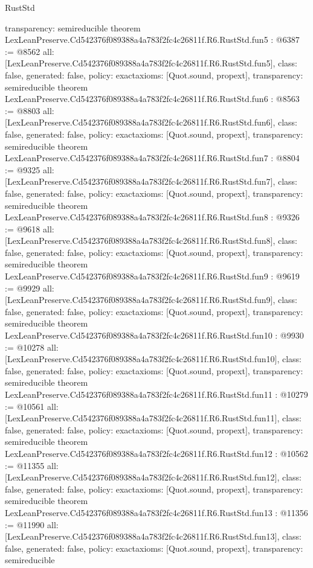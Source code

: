 \begin{lexlean}{RustStd}
\begin{coremodule}
{  transparency: semireducible
}
theorem LexLeanPreserve.Cd542376f089388a4a783f2fc4c26811f.R6.RustStd.fun5 : @6387 := @8562 {
  all: [LexLeanPreserve.Cd542376f089388a4a783f2fc4c26811f.R6.RustStd.fun5],
  class: false,
  generated: false,
  policy: exact{axioms: [Quot.sound, propext]},
  transparency: semireducible
}
theorem LexLeanPreserve.Cd542376f089388a4a783f2fc4c26811f.R6.RustStd.fun6 : @8563 := @8803 {
  all: [LexLeanPreserve.Cd542376f089388a4a783f2fc4c26811f.R6.RustStd.fun6],
  class: false,
  generated: false,
  policy: exact{axioms: [Quot.sound, propext]},
  transparency: semireducible
}
theorem LexLeanPreserve.Cd542376f089388a4a783f2fc4c26811f.R6.RustStd.fun7 : @8804 := @9325 {
  all: [LexLeanPreserve.Cd542376f089388a4a783f2fc4c26811f.R6.RustStd.fun7],
  class: false,
  generated: false,
  policy: exact{axioms: [Quot.sound, propext]},
  transparency: semireducible
}
theorem LexLeanPreserve.Cd542376f089388a4a783f2fc4c26811f.R6.RustStd.fun8 : @9326 := @9618 {
  all: [LexLeanPreserve.Cd542376f089388a4a783f2fc4c26811f.R6.RustStd.fun8],
  class: false,
  generated: false,
  policy: exact{axioms: [Quot.sound, propext]},
  transparency: semireducible
}
theorem LexLeanPreserve.Cd542376f089388a4a783f2fc4c26811f.R6.RustStd.fun9 : @9619 := @9929 {
  all: [LexLeanPreserve.Cd542376f089388a4a783f2fc4c26811f.R6.RustStd.fun9],
  class: false,
  generated: false,
  policy: exact{axioms: [Quot.sound, propext]},
  transparency: semireducible
}
theorem LexLeanPreserve.Cd542376f089388a4a783f2fc4c26811f.R6.RustStd.fun10 : @9930 := @10278 {
  all: [LexLeanPreserve.Cd542376f089388a4a783f2fc4c26811f.R6.RustStd.fun10],
  class: false,
  generated: false,
  policy: exact{axioms: [Quot.sound, propext]},
  transparency: semireducible
}
theorem LexLeanPreserve.Cd542376f089388a4a783f2fc4c26811f.R6.RustStd.fun11 : @10279 := @10561 {
  all: [LexLeanPreserve.Cd542376f089388a4a783f2fc4c26811f.R6.RustStd.fun11],
  class: false,
  generated: false,
  policy: exact{axioms: [Quot.sound, propext]},
  transparency: semireducible
}
theorem LexLeanPreserve.Cd542376f089388a4a783f2fc4c26811f.R6.RustStd.fun12 : @10562 := @11355 {
  all: [LexLeanPreserve.Cd542376f089388a4a783f2fc4c26811f.R6.RustStd.fun12],
  class: false,
  generated: false,
  policy: exact{axioms: [Quot.sound, propext]},
  transparency: semireducible
}
theorem LexLeanPreserve.Cd542376f089388a4a783f2fc4c26811f.R6.RustStd.fun13 : @11356 := @11990 {
  all: [LexLeanPreserve.Cd542376f089388a4a783f2fc4c26811f.R6.RustStd.fun13],
  class: false,
  generated: false,
  policy: exact{axioms: [Quot.sound, propext]},
  transparency: semireducible
}
\end{coremodule}
\end{lexlean}
